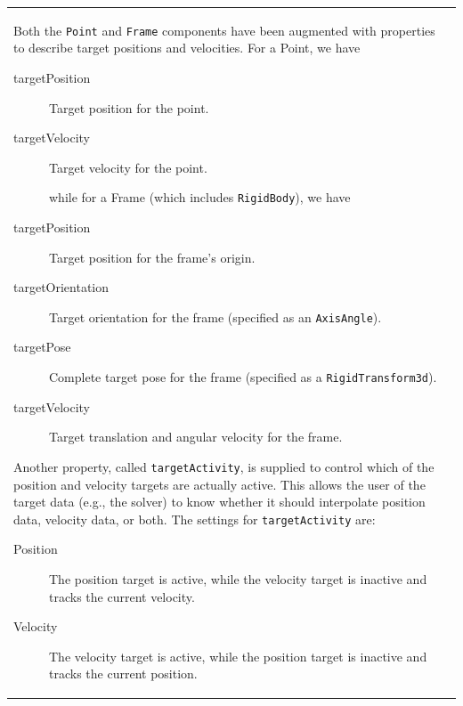 \documentclass{article}
\begin{document}
\begin{tabular}{ll}
Both the {\tt Point} and {\tt Frame} components have been augmented with
properties to describe target positions and velocities. For a Point,
we have 

\begin{description}

\item[targetPosition] \mbox{}

Target position for the point.

\item[targetVelocity] \mbox{}

Target velocity for the point.

while for a Frame (which includes {\tt RigidBody}), we have

\item[targetPosition] \mbox{}

Target position for the frame's origin.

\item[targetOrientation] \mbox{}

Target orientation for the frame (specified as an {\tt AxisAngle}).

\item[targetPose] \mbox{}

Complete target pose for the frame (specified as a {\tt RigidTransform3d}).

\item[targetVelocity] \mbox{}

Target translation and angular velocity for the frame.

\end{description}

Another property, called {\tt targetActivity}, is supplied to control
which of the position and velocity targets are actually active.  This
allows the user of the target data (e.g., the solver) to know whether it should
interpolate position data, velocity data, or both. The settings for
{\tt targetActivity} are:

\begin{description}

\item[Position] \mbox{}

The position target is active, while the velocity target is inactive
and tracks the current velocity.

\item[Velocity] \mbox{}

The velocity target is active, while the position target is inactive
and tracks the current position.


\end{description}
\end{tabular}
\end{document}
